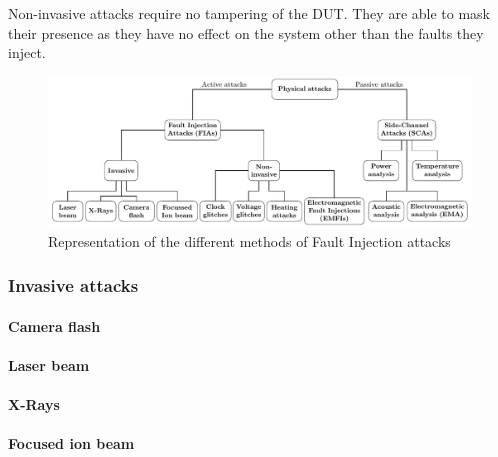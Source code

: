 Non-invasive attacks require no tampering of the DUT. They are able to mask their presence as they have no effect on the system other than the faults they inject.


\begin{figure}[ht]
    \centering
    \includegraphics[page=2, width=.75\textwidth]{c2_soa/img/physicalAttacks.pdf}
    \caption{Representation of the different methods of Fault Injection attacks}
    \label{fig:fia}
\end{figure}

\subsubsection{Invasive attacks}

\paragraph{Camera flash}

\paragraph{Laser beam}

\paragraph{X-Rays} \cite{ABCMRT-17-ches, TMZHM-23-iolts, GBD-23-paine}

\paragraph{Focused ion beam}

